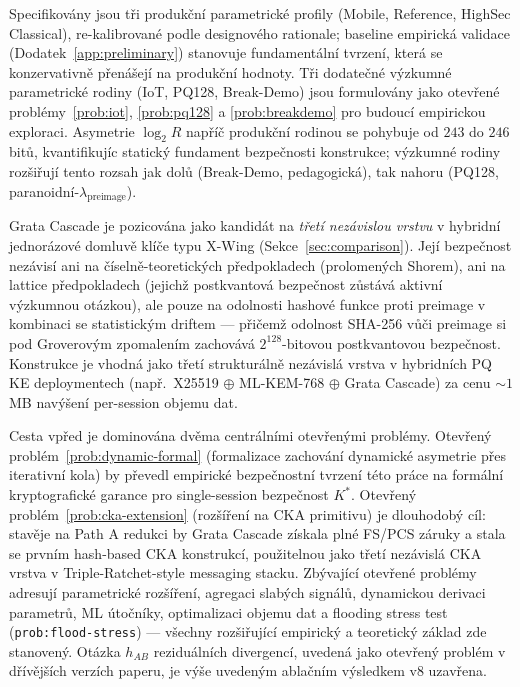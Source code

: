 \documentclass[11pt,a4paper]{article}
\begin{document}
Specifikovány jsou tři produkční parametrické profily (Mobile, Reference, HighSec Classical), re-kalibrované podle designového rationale; baseline empirická validace (Dodatek~\ref{app:preliminary}) stanovuje fundamentální tvrzení, která se konzervativně přenášejí na produkční hodnoty. Tři dodatečné výzkumné parametrické rodiny (IoT, PQ128, Break-Demo) jsou formulovány jako otevřené problémy~\ref{prob:iot}, \ref{prob:pq128} a \ref{prob:breakdemo} pro budoucí empirickou exploraci. Asymetrie $\log_2 R$ napříč produkční rodinou se pohybuje od $243$ do $246$ bitů, kvantifikujíc statický fundament bezpečnosti konstrukce; výzkumné rodiny rozšiřují tento rozsah jak dolů (Break-Demo, pedagogická), tak nahoru (PQ128, paranoidní-$\lambda_\text{preimage}$).

Grata Cascade je pozicována jako kandidát na \emph{třetí nezávislou vrstvu} v hybridní jednorázové domluvě klíče typu X-Wing (Sekce~\ref{sec:comparison}). Její bezpečnost nezávisí ani na číselně-teoretických předpokladech (prolomených Shorem), ani na lattice předpokladech (jejichž postkvantová bezpečnost zůstává aktivní výzkumnou otázkou), ale pouze na odolnosti hashové funkce proti preimage v kombinaci se statistickým driftem --- přičemž odolnost SHA-256 vůči preimage si pod Groverovým zpomalením zachovává $2^{128}$-bitovou postkvantovou bezpečnost. Konstrukce je vhodná jako třetí strukturálně nezávislá vrstva v hybridních PQ KE deploymentech (např.\ X25519 $\oplus$ ML-KEM-768 $\oplus$ Grata Cascade) za cenu $\sim 1$ MB navýšení per-session objemu dat.

Cesta vpřed je dominována dvěma centrálními otevřenými problémy. Otevřený problém~\ref{prob:dynamic-formal} (formalizace zachování dynamické asymetrie přes iterativní kola) by převedl empirické bezpečnostní tvrzení této práce na formální kryptografické garance pro single-session bezpečnost $K^*$. Otevřený problém~\ref{prob:cka-extension} (rozšíření na CKA primitivu) je dlouhodobý cíl: stavěje na Path A redukci by Grata Cascade získala plné FS/PCS záruky a stala se prvním hash-based CKA konstrukcí, použitelnou jako třetí nezávislá CKA vrstva v Triple-Ratchet-style messaging stacku. Zbývající otevřené problémy adresují parametrické rozšíření, agregaci slabých signálů, dynamickou derivaci parametrů, ML útočníky, optimalizaci objemu dat a flooding stress test (\texttt{prob:flood-stress}) --- všechny rozšiřující empirický a teoretický základ zde stanovený. Otázka $h_{AB}$ reziduálních divergencí, uvedená jako otevřený problém v dřívějších verzích paperu, je výše uvedeným ablačním výsledkem v8 uzavřena.
\end{document}
